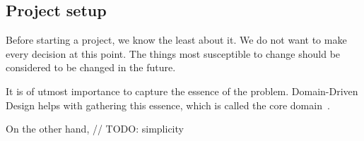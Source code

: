 \subsection{Project setup}\label{sec:project-setup}

Before starting a project,
we know the least about it.
We do not want to make every decision at this point.
The things most susceptible to change
should be considered to be changed in the future.

It is of utmost importance to capture
the essence of the problem.
Domain-Driven Design helps with
gathering this essence,
which is called
the core domain~\cite[Part~I, Chapter~3]{millett_patterns_2015}.

On the other hand, // TODO: simplicity
